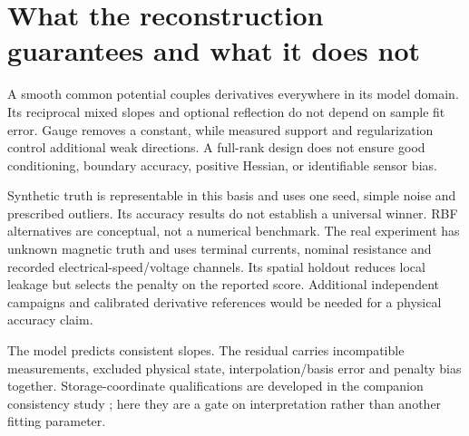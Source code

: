 \section{What the reconstruction guarantees and what it does not}
A smooth common potential couples derivatives everywhere in its model domain.
Its reciprocal mixed slopes and optional reflection do not depend on sample
fit error. Gauge removes a constant, while measured support and regularization
control additional weak directions. A full-rank design does not ensure good
conditioning, boundary accuracy, positive Hessian, or identifiable sensor bias.

Synthetic truth is representable in this basis and uses one seed, simple noise
and prescribed outliers. Its accuracy results do not establish a universal
winner. RBF alternatives are conceptual, not a numerical benchmark.
The real experiment has unknown magnetic truth and uses terminal currents,
nominal resistance and recorded electrical-speed/voltage channels. Its
spatial holdout reduces local leakage but selects the penalty on the reported
score. Additional independent campaigns and calibrated derivative references
would be needed for a physical accuracy claim.

The model predicts consistent slopes. The residual carries incompatible
measurements, excluded physical state, interpolation/basis error and penalty
bias together. Storage-coordinate qualifications are developed in the
companion consistency study \cite{companion-consistency}; here they are a
gate on interpretation rather than another fitting parameter.
